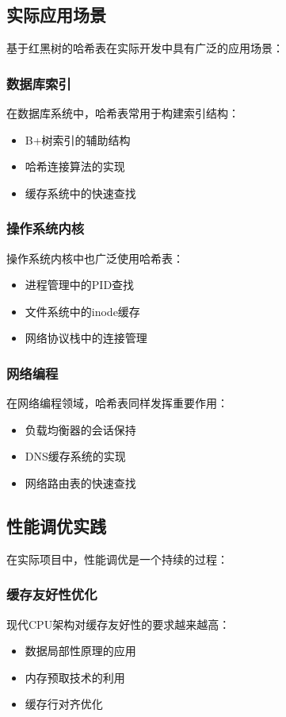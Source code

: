 \documentclass[12pt,a4paper]{article}
\begin{document}
\subsection{实际应用场景}
基于红黑树的哈希表在实际开发中具有广泛的应用场景：

\subsubsection{数据库索引}
在数据库系统中，哈希表常用于构建索引结构：
\begin{itemize}
\item B+树索引的辅助结构
\item 哈希连接算法的实现
\item 缓存系统中的快速查找
\end{itemize}

\subsubsection{操作系统内核}
操作系统内核中也广泛使用哈希表：
\begin{itemize}
\item 进程管理中的PID查找
\item 文件系统中的inode缓存
\item 网络协议栈中的连接管理
\end{itemize}

\subsubsection{网络编程}
在网络编程领域，哈希表同样发挥重要作用：
\begin{itemize}
\item 负载均衡器的会话保持
\item DNS缓存系统的实现
\item 网络路由表的快速查找
\end{itemize}

\subsection{性能调优实践}
在实际项目中，性能调优是一个持续的过程：

\subsubsection{缓存友好性优化}
现代CPU架构对缓存友好性的要求越来越高：
\begin{itemize}
\item 数据局部性原理的应用
\item 内存预取技术的利用
\item 缓存行对齐优化
\end{itemize}
\end{document}
